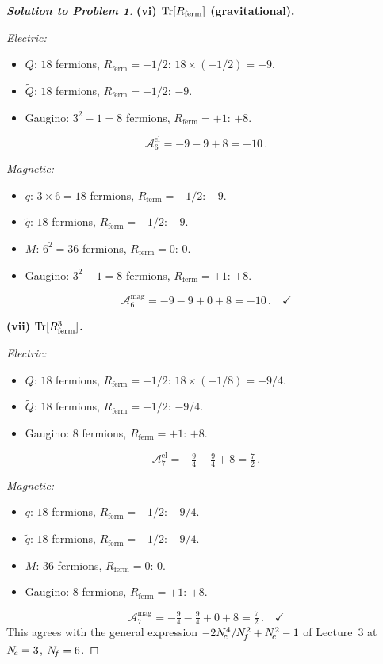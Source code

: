 \documentclass[11pt,a4paper]{article}
\begin{document}
\begin{proof}[\textbf{Solution to Problem 1}]
\medskip

\textbf{(vi) $\mathrm{Tr}[R_{\mathrm{ferm}}]$ (gravitational).}

\textit{Electric:}
\begin{itemize}
  \item $Q$: $18$ fermions, $R_{\mathrm{ferm}} = -1/2$: $18 \times
    (-1/2) = -9$.
  \item $\widetilde{Q}$: $18$ fermions, $R_{\mathrm{ferm}} = -1/2$:
    $-9$.
  \item Gaugino: $3^2 - 1 = 8$ fermions, $R_{\mathrm{ferm}} = +1$:
    $+8$.
\end{itemize}
\[
  \mathcal{A}^{\mathrm{el}}_6 = -9 - 9 + 8 = \boxed{-10}\,.
\]

\textit{Magnetic:}
\begin{itemize}
  \item $q$: $3 \times 6 = 18$ fermions, $R_{\mathrm{ferm}} = -1/2$:
    $-9$.
  \item $\widetilde{q}$: $18$ fermions, $R_{\mathrm{ferm}} = -1/2$:
    $-9$.
  \item $M$: $6^2 = 36$ fermions, $R_{\mathrm{ferm}} = 0$:
    $0$.
  \item Gaugino: $3^2 - 1 = 8$ fermions, $R_{\mathrm{ferm}} = +1$:
    $+8$.
\end{itemize}
\[
  \mathcal{A}^{\mathrm{mag}}_6 = -9 - 9 + 0 + 8 = \boxed{-10}\,.
  \quad\checkmark
\]

\medskip

\textbf{(vii) $\mathrm{Tr}[R_{\mathrm{ferm}}^3]$.}

\textit{Electric:}
\begin{itemize}
  \item $Q$: $18$ fermions, $R_{\mathrm{ferm}} = -1/2$:
    $18 \times (-1/8) = -9/4$.
  \item $\widetilde{Q}$: $18$ fermions, $R_{\mathrm{ferm}} = -1/2$:
    $-9/4$.
  \item Gaugino: $8$ fermions, $R_{\mathrm{ferm}} = +1$: $+8$.
\end{itemize}
\[
  \mathcal{A}^{\mathrm{el}}_7 = -\tfrac{9}{4} - \tfrac{9}{4} + 8
  = \boxed{\tfrac{7}{2}}\,.
\]

\textit{Magnetic:}
\begin{itemize}
  \item $q$: $18$ fermions, $R_{\mathrm{ferm}} = -1/2$: $-9/4$.
  \item $\widetilde{q}$: $18$ fermions, $R_{\mathrm{ferm}} = -1/2$:
    $-9/4$.
  \item $M$: $36$ fermions, $R_{\mathrm{ferm}} = 0$: $0$.
  \item Gaugino: $8$ fermions, $R_{\mathrm{ferm}} = +1$: $+8$.
\end{itemize}
\[
  \mathcal{A}^{\mathrm{mag}}_7 = -\tfrac{9}{4} - \tfrac{9}{4} + 0 + 8
  = \boxed{\tfrac{7}{2}}\,.
  \quad\checkmark
\]
This agrees with the general expression $-2N_{\!c}^4/N_{\!f}^2 + N_{\!c}^2 - 1$ of
Lecture~3 at $N_{\!c} = 3$, $N_{\!f} = 6$.


\end{proof}
\end{document}
